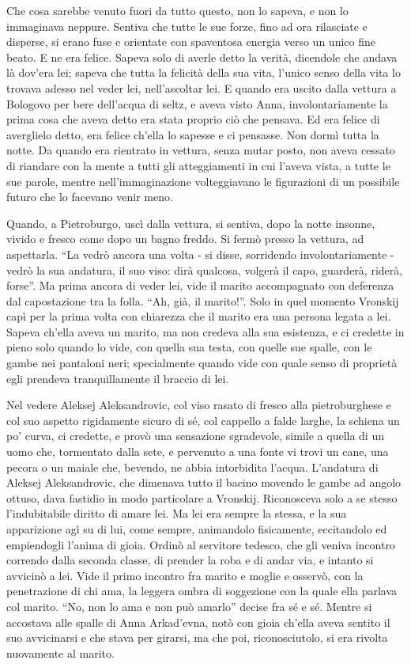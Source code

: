 Che cosa sarebbe venuto fuori da tutto questo, non lo sapeva, e non lo immaginava neppure. Sentiva che tutte le sue forze, fino ad ora rilasciate e disperse, si erano fuse e orientate con spaventosa energia verso un unico fine beato. E ne era felice. Sapeva solo di averle detto la verità, dicendole che andava là dov'era lei; sapeva che tutta la felicità della sua vita, l'unico senso della vita lo trovava adesso nel veder lei, nell'ascoltar lei. E quando era uscito dalla vettura a Bologovo per bere dell'acqua di seltz, e aveva visto Anna, involontariamente la prima cosa che aveva detto era stata proprio ciò che pensava. Ed era felice di averglielo detto, era felice ch'ella lo sapesse e ci pensasse. Non dormì tutta la notte. Da quando era rientrato in vettura, senza mutar posto, non aveva cessato di riandare con la mente a tutti gli atteggiamenti in cui l'aveva vista, a tutte le sue parole, mentre nell'immaginazione volteggiavano le figurazioni di un possibile futuro che lo facevano venir meno. 

Quando, a Pietroburgo, uscì dalla vettura, si sentiva, dopo la notte insonne, vivido e fresco come dopo un bagno freddo. Si fermò presso la vettura, ad aspettarla. ``La vedrò ancora una volta - si disse, sorridendo involontariamente - vedrò la sua andatura, il suo viso: dirà qualcosa, volgerà il capo, guarderà, riderà, forse''. Ma prima ancora di veder lei, vide il marito accompagnato con deferenza dal capostazione tra la folla. ``Ah, già, il marito!''. Solo in quel momento Vronskij capì per la prima volta con chiarezza che il marito era una persona legata a lei. Sapeva ch'ella aveva un marito, ma non credeva alla sua esistenza, e ci credette in pieno solo quando lo vide, con quella sua testa, con quelle sue spalle, con le gambe nei pantaloni neri; specialmente quando vide con quale senso di proprietà egli prendeva tranquillamente il braccio di lei. 

Nel vedere Aleksej Aleksandrovic, col viso rasato di fresco alla pietroburghese e col suo aspetto rigidamente sicuro di sé, col cappello a falde larghe, la schiena un po' curva, ci credette, e provò una sensazione sgradevole, simile a quella di un uomo che, tormentato dalla sete, e pervenuto a una fonte vi trovi un cane, una pecora o un maiale che, bevendo, ne abbia intorbidita l'acqua. L'andatura di Aleksej Aleksandrovic, che dimenava tutto il bacino movendo le gambe ad angolo ottuso, dava fastidio in modo particolare a Vronskij. Riconosceva solo a se stesso l'indubitabile diritto di amare lei. Ma lei era sempre la stessa, e la sua apparizione agì su di lui, come sempre, animandolo fisicamente, eccitandolo ed empiendogli l'anima di gioia. Ordinò al servitore tedesco, che gli veniva incontro correndo dalla seconda classe, di prender la roba e di andar via, e intanto si avvicinò a lei. Vide il primo incontro fra marito e moglie e osservò, con la penetrazione di chi ama, la leggera ombra di soggezione con la quale ella parlava col marito. ``No, non lo ama e non può amarlo'' decise fra sé e sé. Mentre si accostava alle spalle di Anna Arkad'evna, notò con gioia ch'ella aveva sentito il suo avvicinarsi e che stava per girarsi, ma che poi, riconosciutolo, si era rivolta nuovamente al marito. 

